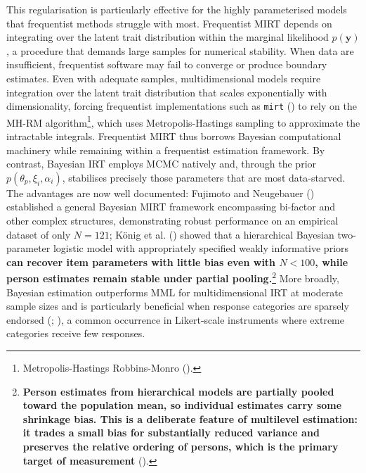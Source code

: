 \documentclass[
  man,
  floatsintext,
  longtable,
  nolmodern,
  notxfonts,
  notimes,
  colorlinks=true,linkcolor=blue,citecolor=blue,urlcolor=blue]{apa7}
\newcommand{\rev}[1]{\textbf{\textcolor{revcol}{#1}}}  %
\begin{document}
This regularisation is particularly effective for the highly
parameterised models that frequentist methods struggle with most.
Frequentist MIRT depends on integrating over the latent trait
distribution within the marginal likelihood \(p(\mathbf{y})\), a
procedure that demands large samples for numerical stability. When data
are insufficient, frequentist software may fail to converge or produce
boundary estimates. Even with adequate samples, multidimensional models
require integration over the latent trait distribution that scales
exponentially with dimensionality, forcing frequentist implementations
such as \texttt{mirt} ()
to rely on the MH-RM algorithm\footnote{Metropolis-Hastings
  Robbins-Monro ().}, which uses
Metropolis-Hastings sampling to approximate the intractable integrals.
Frequentist MIRT thus borrows Bayesian computational machinery while
remaining within a frequentist estimation framework. By contrast,
Bayesian IRT employs MCMC natively and, through the prior
\(p(\theta_p, \xi_i, \alpha_i)\), stabilises precisely those parameters
that are most data-starved. The advantages are now well documented:
Fujimoto and Neugebauer ()
established a general Bayesian MIRT framework encompassing bi-factor and
other complex structures, demonstrating robust performance on an
empirical dataset of only \(N = 121\); König et al.
() showed that a hierarchical
Bayesian two-parameter logistic model with appropriately specified
weakly informative priors
\rev{can recover item parameters with little bias even with $N < 100$, while person estimates remain stable under partial pooling.}\footnote{\rev{Person estimates from hierarchical models are partially pooled toward the population mean, so individual estimates carry some shrinkage bias. This is a deliberate feature of multilevel estimation: it trades a small bias for substantially reduced variance and preserves the relative ordering of persons, which is the primary target of measurement}
  ().} More broadly, Bayesian
estimation outperforms MML for multidimensional IRT at moderate sample
sizes and is particularly beneficial when response categories are
sparsely endorsed (; ), a common
occurrence in Likert-scale instruments where extreme categories receive
few responses.
\end{document}
